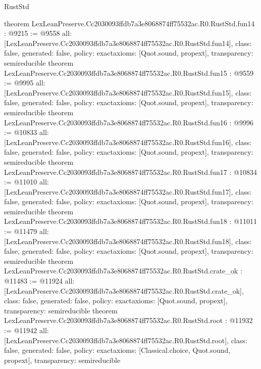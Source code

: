 \begin{lexlean}{RustStd}
\begin{coremodule}
{}
theorem LexLeanPreserve.Cc2030093ffdb7a3e8068874ff75532ac.R0.RustStd.fun14 : @9215 := @9558 {
  all: [LexLeanPreserve.Cc2030093ffdb7a3e8068874ff75532ac.R0.RustStd.fun14],
  class: false,
  generated: false,
  policy: exact{axioms: [Quot.sound, propext]},
  transparency: semireducible
}
theorem LexLeanPreserve.Cc2030093ffdb7a3e8068874ff75532ac.R0.RustStd.fun15 : @9559 := @9995 {
  all: [LexLeanPreserve.Cc2030093ffdb7a3e8068874ff75532ac.R0.RustStd.fun15],
  class: false,
  generated: false,
  policy: exact{axioms: [Quot.sound, propext]},
  transparency: semireducible
}
theorem LexLeanPreserve.Cc2030093ffdb7a3e8068874ff75532ac.R0.RustStd.fun16 : @9996 := @10833 {
  all: [LexLeanPreserve.Cc2030093ffdb7a3e8068874ff75532ac.R0.RustStd.fun16],
  class: false,
  generated: false,
  policy: exact{axioms: [Quot.sound, propext]},
  transparency: semireducible
}
theorem LexLeanPreserve.Cc2030093ffdb7a3e8068874ff75532ac.R0.RustStd.fun17 : @10834 := @11010 {
  all: [LexLeanPreserve.Cc2030093ffdb7a3e8068874ff75532ac.R0.RustStd.fun17],
  class: false,
  generated: false,
  policy: exact{axioms: [Quot.sound, propext]},
  transparency: semireducible
}
theorem LexLeanPreserve.Cc2030093ffdb7a3e8068874ff75532ac.R0.RustStd.fun18 : @11011 := @11479 {
  all: [LexLeanPreserve.Cc2030093ffdb7a3e8068874ff75532ac.R0.RustStd.fun18],
  class: false,
  generated: false,
  policy: exact{axioms: [Quot.sound, propext]},
  transparency: semireducible
}
theorem LexLeanPreserve.Cc2030093ffdb7a3e8068874ff75532ac.R0.RustStd.crate_ok : @11483 := @11924 {
  all: [LexLeanPreserve.Cc2030093ffdb7a3e8068874ff75532ac.R0.RustStd.crate_ok],
  class: false,
  generated: false,
  policy: exact{axioms: [Quot.sound, propext]},
  transparency: semireducible
}
theorem LexLeanPreserve.Cc2030093ffdb7a3e8068874ff75532ac.R0.RustStd.root : @11932 := @11942 {
  all: [LexLeanPreserve.Cc2030093ffdb7a3e8068874ff75532ac.R0.RustStd.root],
  class: false,
  generated: false,
  policy: exact{axioms: [Classical.choice, Quot.sound, propext]},
  transparency: semireducible
}


\end{coremodule}
\end{lexlean}
